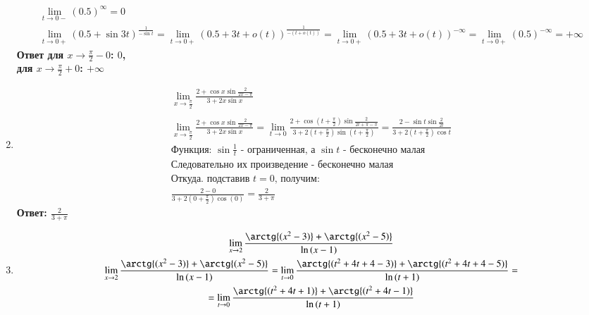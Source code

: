 \begin{enumerate}
\begin{gather*}
              \lim_{t\rightarrow  0- }{
                  (0.5)^{\infty}} = 0 \\
              \lim_{t\rightarrow  0+ }{
                  (0.5+\sin{3t})^{\frac{1}{-\sin{t}}}} =
              \lim_{t\rightarrow  0+ }{
                  (0.5+3t+o(t))^{\frac{1}{-(t+o(t))}}} =
              \lim_{t\rightarrow  0+ }
              (0.5+3t+o(t))^{-\infty} =
              \lim_{t\rightarrow  0+ }
              (0.5)^{-\infty} = +\infty
          \end{gather*}
          {\bf Ответ для $x\rightarrow \frac{\pi}{2}-0$: $0$, \\ для $x\rightarrow \frac{\pi}{2}+0$: $+\infty$}
    \item
          \begin{gather*}
              \lim_{x\rightarrow  \frac{\pi}{2}}{
                  \frac{2+\cos{x}\sin{\frac{2}{2x-\pi}}}{3+2x\sin{x}}} \\
              \\
              \lim_{x\rightarrow  \frac{\pi}{2}}{
                  \frac{2+\cos{x}\sin{\frac{2}{2x-\pi}}}{3+2x\sin{x}}} =
              \lim_{t\rightarrow  0}{
                  \frac{2+\cos{(t+\frac{\pi}{2})}\sin{\frac{2}{2t+\pi-\pi}}}{3+2(t+\frac{\pi}{2})\sin{\left(t+\frac{\pi}{2}\right)}}} = \frac{2-\sin{t}\sin{\frac{2}{2t}}}{3+2(t+\frac{\pi}{2})\cos{t}} \\
              \text{Функция: } \sin{\frac{1}{t}} \text{ - ограниченная, а } \sin{t} \text{ - бесконечно малая} \\ \text{Следовательно их произведение - бесконечно малая} \\
              \text{Откуда. подставив $t = 0$, получим: } \\
              \frac{2-0}{3+2(0+\frac{\pi}{2})\cos{(0)}} = \frac{2}{3+\pi}
          \end{gather*}
          {\bf Ответ: $\frac{2}{3+\pi}$}
    \item
          \begin{gather*}
              \lim_{x\rightarrow  2}{
                  \frac{\arctg{(x^2-3)}+\arctg{(x^2-5)}}{\ln{(x-1)}}
              } \\
              \lim_{x\rightarrow  2}{
                  \frac{\arctg{(x^2-3)}+\arctg{(x^2-5)}}{\ln{(x-1)}}
              } = 
              \lim_{t\rightarrow  0}{
                  \frac{\arctg{(t^2+4t+4-3)}+\arctg{(t^2+4t+4-5)}}{\ln{(t+1)}}
              } =\\=
              \lim_{t\rightarrow  0}{
                  \frac{\arctg{(t^2+4t+1)}+\arctg{(t^2+4t-1)}}{\ln{(t+1)}}
}
\end{gather*}
\end{enumerate}

